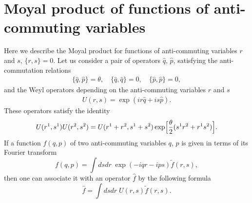 \documentclass[a4paper,12pt]{article}
\begin{document}
\section{Moyal product of functions of anti-commuting variables}
\label{sec:mpfer}
\setcounter{equation}{0}

Here we describe the Moyal product for functions
of anti-commuting variables $r$ and $s$, $\{r,s\}=0$.
Let us consider a pair of operators $\hat{q}$, $\hat{p}$,
satisfying the anti-commutation relations
\begin{gather}
\{\hat{q},\hat{p}\}=\theta,\quad \{\hat{q},\hat{q}\}=0, \quad
\{\hat{p},\hat{p}\}=0,
\end{gather}
and the Weyl operators depending on the
anti-commuting variables $r$ and $s$
\begin{gather}
U(r,s)=\exp(ir\hat{q}+is\hat{p}).
\end{gather}
These operators satisfy the identity
\begin{equation}
U(r^{1},s^{1})U(r^{2},s^{2}) =U(r^{1}+r^{2},s^{1}+s^{2})
\exp\Bigl[\frac{\theta}{2}(s^{1}r^{2}+r^{1}s^{2})\Bigr].
\end{equation}
If a function $f(q,p)$ of two anti-commuting variables $q$, $p$ is given
in terms of its Fourier transform
\begin{equation}
f(q,p)=\int dsdr\; \exp(-iqr-ips)\tilde{f}(r,s),
\end{equation}
then one can associate it with an operator $\hat{f}$  by the
following formula
\begin{equation}
\hat{f}=\int dsdr\; U(r,s)\tilde{f}(r,s).
\end{equation}
\end{document}
